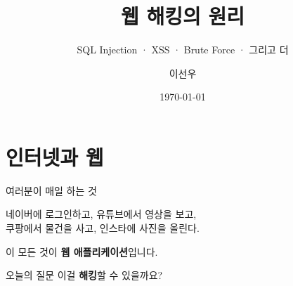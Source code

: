 \documentclass[aspectratio=169,10pt]{beamer}
\title{웹 해킹의 원리}
\subtitle{SQL Injection · XSS · Brute Force · 그리고 더}
\author{이선우}
\institute{KENTECH STIS Lab}
\date{\today}
\newcommand{\hlt}[1]{\textcolor{accent}{\textbf{#1}}}
\begin{document}
\maketitle

\section{인터넷과 웹}

\begin{frame}[shrink=10]{여러분이 매일 하는 것}
\begin{center}
\Large
네이버에 로그인하고, 유튜브에서 영상을 보고,\\
쿠팡에서 물건을 사고, 인스타에 사진을 올린다.
\end{center}

\vspace{1em}
\begin{center}
이 모든 것이 \hlt{웹 애플리케이션}입니다.
\end{center}

\vspace{1em}
\begin{alertblock}{오늘의 질문}
\Large 이걸 \hlt{해킹}할 수 있을까요?
\end{alertblock}
\end{frame}
\end{document}
